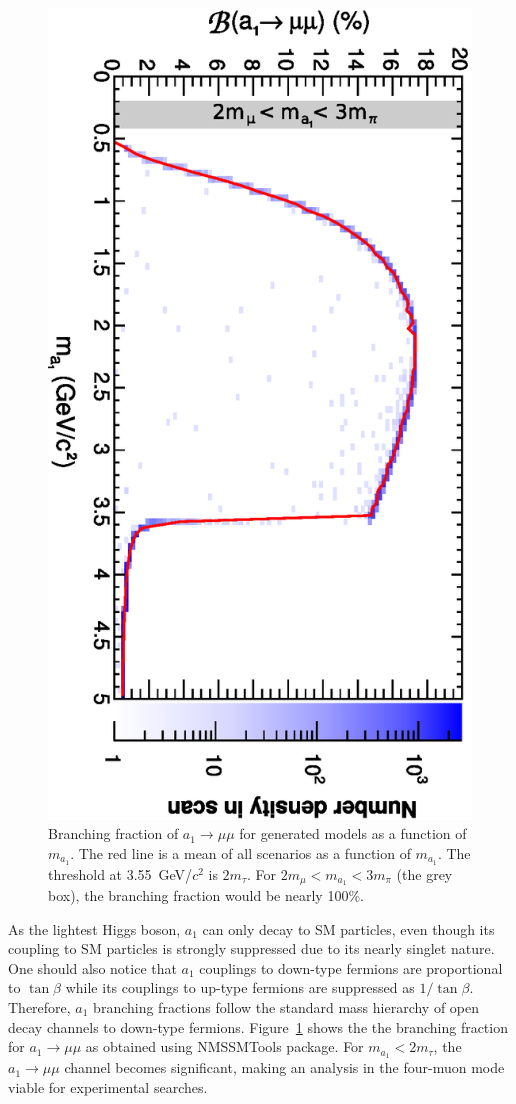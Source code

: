 \documentclass[aps,prl,twocolumn,nofootinbib,superscriptaddress]{revtex4}
\begin{document}
\begin{figure}[htb]
\includegraphics[height=0.95\linewidth, angle=90]{bra_vs_ma}
\caption{Branching fraction of $a_1 \to \mu \mu$ for generated models
  as a function of $m_{a_1}$.  The red line is a mean of all scenarios
  as a function of $m_{a_1}$.  The threshold at 3.55~GeV/$c^2$ is $2m_\tau$.
  For $2m_\mu < m_{a_1} < 3m_\pi$ (the grey box), the branching
  fraction would be nearly 100\%. \label{fig:bramm}}
\end{figure}

As the lightest Higgs boson, $a_1$ can only decay to SM particles,
even though its coupling to SM particles is strongly suppressed due to
its nearly singlet nature.  One should also notice that $a_1$
couplings to down-type fermions are proportional to $\tan\beta$ while
its couplings to up-type fermions are suppressed as $1/\tan\beta$.
Therefore, $a_1$ branching fractions follow the standard mass
hierarchy of open decay channels to down-type fermions.
Figure~\ref{fig:bramm} shows the the branching fraction for $a_1 \to
\mu\mu$ as obtained using NMSSMTools package.  For $m_{a_1} <
2m_\tau$, the $a_1 \to \mu\mu$ channel becomes significant, making an
analysis in the four-muon mode viable for experimental searches.
\end{document}
